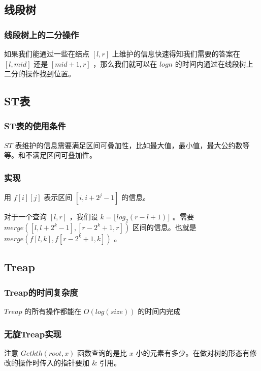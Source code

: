 \documentclass[11pt]{article}
\begin{document}
\subsection{线段树}
\label{sec-4-2}
\subsubsection{线段树上的二分操作}
\label{sec-4-2-1}

如果我们能通过一些在结点 $[l,r]$ 上维护的信息快速得知我们需要的答案在 $[l,mid]$ 还是 $[mid+1,r]$ ，那么我们就可以在 $logn$ 的时间内通过在线段树上二分的操作找到位置。
\subsection{ST表}
\label{sec-4-3}

\subsubsection{ST表的使用条件}
\label{sec-4-3-1}

$ST$ 表维护的信息需要满足区间可叠加性，比如最大值，最小值，最大公约数等等。和不满足区间可叠加性。

\subsubsection{实现}
\label{sec-4-3-2}

用 $f[i][j]$ 表示区间 $[i,i+2^j-1]$ 的信息。

对于一个查询 $[l,r]$ ，我们设 $k=\lfloor log_2(r-l+1) \rfloor$ 。需要 $merge([l,l+2^k -1],[r-2^k+1,r])$ 区间的信息。也就是 $merge(f[l,k],f[r-2^k+1,k])$ 。
\subsection{Treap}
\label{sec-4-4}

\subsubsection{Treap的时间复杂度}
\label{sec-4-4-1}

$Treap$ 的所有操作都能在 $O(log(size))$ 的时间内完成

\subsubsection{无旋Treap实现}
\label{sec-4-4-2}

注意 $Getkth(root,x)$ 函数查询的是比 $x$ 小的元素有多少。在做对树的形态有修改的操作时传入的指针要加 \& 引用。
\end{document}
